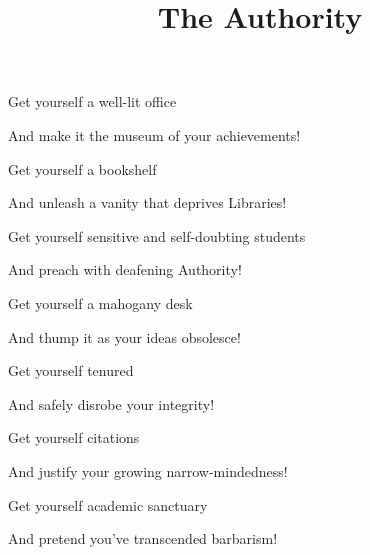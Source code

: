 \documentclass{article}
\title{The Authority}
\begin{document}
 \newline

Get yourself a well-lit office \newline

And make it the museum of your achievements!\newline\newline

Get yourself a bookshelf\newline

And unleash a vanity that deprives Libraries!\newline\newline

Get yourself sensitive and self-doubting students\newline

And preach with deafening Authority!\newline\newline

Get yourself a mahogany desk\newline

And thump it as your ideas obsolesce!\newline\newline

Get yourself tenured\newline

And safely disrobe your integrity!\newline\newline

Get yourself citations\newline

And justify your growing narrow-mindedness!\newline\newline

Get yourself academic sanctuary\newline

And pretend you've transcended barbarism!\newline\newline
\end{document}
